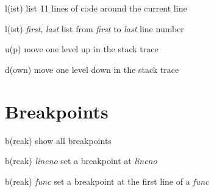 \documentclass[11pt,landscape,a4paper]{scrartcl}
\begin{document}
\begin{multicols}{2}
\begin{eqlist}
        \item[l(ist)] list 11 lines of code around the current line
        \item[l(ist) \textit{first}, \textit{last}] list from \textit{first} to \textit{last} line number
        
        \item[u(p)] move one level up in the stack trace
        \item[d(own)] move one level down in the stack trace
      \end{eqlist}

    \section{Breakpoints}
      \begin{eqlist}
        \item[b(reak)] show all breakpoints
        \item[b(reak) \textit{lineno}] set a breakpoint at \textit{lineno}
        \item[b(reak) \textit{func}] set a breakpoint at the first line of a \textit{func}
      \end{eqlist}
  \end{multicols}
    \let\thefootnote\relax{}
\end{document}
